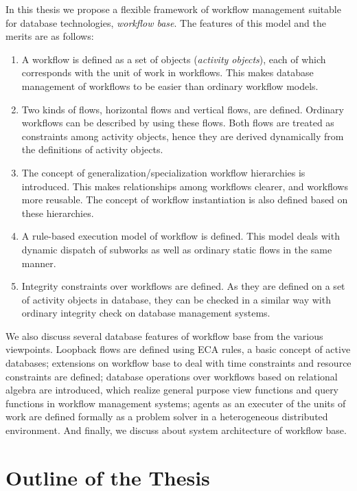 In this thesis we propose a flexible framework of workflow management
suitable for database technologies, {\em workflow base}.  The features
of this model and the merits are as follows:
\begin{enumerate}
\setlength{\itemsep}{0mm}
\setlength{\parskip}{0mm}
 \item A workflow is defined as a set of objects (\emph{activity
       objects}), each of which corresponds with the unit of work in
       workflows.  This makes database management of workflows to be
       easier than ordinary workflow models.
 \item Two kinds of flows, horizontal flows and vertical flows, are
       defined.  Ordinary workflows can be described by using these
       flows.  Both flows are treated as constraints among activity
       objects, hence they are derived dynamically from the definitions
       of activity objects.
 \item The concept of generalization/specialization workflow hierarchies is
       introduced.  This makes relationships among workflows clearer,
       and workflows more reusable.  The concept of workflow
       instantiation is also defined based on these hierarchies.
 \item A rule-based execution model of workflow is defined.  This model
       deals with dynamic dispatch of subworks as well as ordinary
       static flows in the same manner.
 \item Integrity constraints over workflows are defined.  As they are
       defined on a set of activity objects in database, they can be
       checked in a similar way with ordinary integrity check on
       database management systems.
\end{enumerate}

We also discuss several database features of workflow base from the various
viewpoints.  Loopback flows are defined using ECA rules, a basic concept 
of active databases; extensions on workflow base to deal with time constraints
and resource constraints are defined; database operations over workflows
based on relational algebra are introduced, which realize general purpose
view functions and query functions in workflow management systems;
agents as an executer of the units of work are defined formally as a
problem solver in a heterogeneous distributed environment.  And finally, 
we discuss about system architecture of workflow base.

\section{Outline of the Thesis}
\label{sec:outline}

